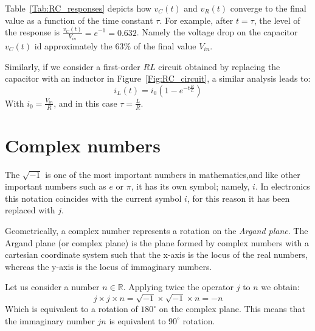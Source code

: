 Table~\ref{Tab:RC_responses} depicts how $v_C(t)$ and $v_R(t)$ converge to the final value as a function of the time constant $\tau$. For example, after $t=\tau$, the level of the response is $\frac{v_C(t)}{V_{in}} = e^{-1} = 0.632$. Namely the voltage drop on the capacitor $v_C(t)$ id approximately the $63\%$ of the final value $V_{in}$.

Similarly, if we consider a first-order $RL$ circuit obtained by replacing the capacitor with an inductor in Figure~\ref{Fig:RC_circuit}, a similar analysis leads to:
\begin{equation}
i_L(t)= i_0\left(1 - e^{-t\frac{R}{L}}\right)
\end{equation}
 With $i_0=\frac{V_{in}}{R}$, and in this case $\tau = \frac{L}{R}$.

\section{Complex numbers}
The $\sqrt{-1}$ is one of the most important numbers in mathematics,and like other important numbers such as $e$ or $\pi$, it has its own symbol; namely, $i$. In electronics this notation coincides with the current symbol $i$, for this reason it has been replaced with $j$.

Geometrically, a complex number represents a rotation on the \emph{Argand plane}. The Argand plane (or complex plane) is the plane formed by complex numbers with a cartesian coordinate system such that the x-axis is the locus of the real numbers, whereas the y-axis is the locus of immaginary numbers.

Let us consider a number $n\in\mathbb{R}$. Applying twice the operator $j$ to $n$ we obtain:
\[j\times j \times n = \sqrt{-1} \times \sqrt{-1} \times n = -n\]
Which is equivalent to a rotation of $180^{\circ}$ on the complex plane. This means that the immaginary number $jn$ is equivalent to $90^{\circ}$ rotation.

